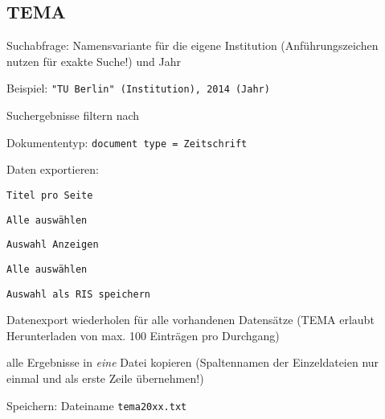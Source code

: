 \subsection*{TEMA}
\begin{compactitem}
\item Suchabfrage: Namensvariante für die eigene Institution (Anführungszeichen nutzen für exakte Suche!) und Jahr
	\begin{compactitem}
    \item Beispiel: \texttt{"{}TU Berlin"{} (Institution), 2014 (Jahr)}
    \end{compactitem}
\item Suchergebnisse filtern nach
	\begin{compactitem}
    \item Dokumententyp: \texttt{document type = Zeitschrift}
    \end{compactitem}
\item Daten exportieren: 
	\begin{compactitem}
    \item \texttt{Titel pro Seite}
	\item \texttt{Alle auswählen}
    \item \texttt{Auswahl Anzeigen}
    \item \texttt{Alle auswählen}
    \item \texttt{Auswahl als RIS speichern}
    \end{compactitem}
\item Datenexport wiederholen für alle vorhandenen Datensätze (TEMA erlaubt Herunterladen von max. 100 Einträgen pro Durchgang)
\item alle Ergebnisse in \textit{eine} Datei kopieren (Spaltennamen der Einzeldateien nur einmal und als erste Zeile übernehmen!)
\item Speichern: Dateiname \texttt{tema20xx.txt}
\end{compactitem}

